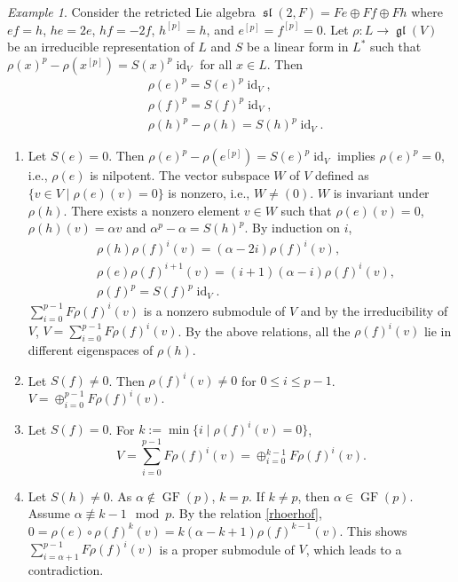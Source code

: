 \documentclass[12pt,MSc]{muthesis_2023}
\theoremstyle{plain}%
\theoremstyle{definition}
\theoremstyle{remark}
\newtheorem{Example}[FactCounter]{Example} %
\DeclareMathOperator{\gl}{\mathfrak{gl}}
\DeclareMathOperator{\Sl}{\mathfrak{sl}}
\DeclareMathOperator{\id}{id}
\DeclareMathOperator{\GF}{GF}
\begin{document}
\begin{Example}\label{sl2isomorphismclasses}
Consider the retricted Lie algebra $\Sl(2,F)=Fe\oplus Ff\oplus Fh$ where $ef=h$, $he=2e$, $hf=-2f$, $h^{[p]}=h$, and $e^{[p]}=f^{[p]}=0$. Let $\rho: L\rightarrow \gl(V)$ be an irreducible representation of $L$ and $S$ be a linear form in $L^*$ such that ${\rho(x)}^p-\rho(x^{[p]})={S(x)}^p\id_V$ for all $x\in L$. Then
\begin{align*}
&{\rho(e)}^p={S(e)}^p\id_V,\\
&{\rho(f)}^p={S(f)}^p\id_V,\\
&{\rho(h)}^p-\rho(h)={S(h)}^p\id_V.
\end{align*}

\begin{enumerate}
\item[(a)] Let $S(e)=0$. Then ${\rho(e)}^p-\rho(e^{[p]})={S(e)}^p\id_V$ implies ${\rho(e)}^p=0$, i.e., $\rho(e)$ is nilpotent. The vector subspace $W$ of $V$ defined as $\{v\in V \mid \rho(e)(v)=0\}$ is nonzero, i.e., $W\neq (0)$. $W$ is invariant under $\rho(h)$. There exists a nonzero element $v\in W$ such that $\rho(e)(v)=0$, $\rho(h)(v)=\alpha v$ and $\alpha^p-\alpha = {S(h)}^p$. By induction on $i$,
\begin{align}
&\rho(h){\rho(f)}^i(v)=(\alpha-2i){\rho(f)}^i(v),\\
\label{rhoerhof}&\rho(e){\rho(f)}^{i+1}(v)= (i+1)(\alpha-i){\rho(f)}^i(v),\\
&{\rho(f)}^p={S(f)}^p\id_V.
\end{align}
$\sum_{i=0}^{p-1}F{\rho(f)}^i(v)$ is a nonzero submodule of $V$ and by the irreducibility of $V$, $V=\sum_{i=0}^{p-1}F{\rho(f)}^i(v)$. By the above relations, all the $\rho(f)^i(v)$ lie in different eigenspaces of $\rho(h)$.

\item[(a.1)] Let $S(f)\neq 0$. Then $\rho(f)^i(v)\neq 0$ for $0 \leq i \leq p-1$. $V= \oplus^{p-1}_{i=0}F{\rho(f)}^i(v).$

\item[(a.2)]
Let $S(f)=0$. For $k:=\min\{i \mid {\rho(f)}^i(v)=0\}$,
$$V=\sum_{i=0}^{p-1}F{\rho(f)}^i(v)= \oplus^{k-1}_{i=0}F{\rho(f)}^i(v).$$


\item[(a.2.1)] Let $S(h)\neq 0$. As $\alpha\notin \GF(p)$, $k=p$. If $k\neq p$, then $\alpha \in \GF(p)$. Assume $\alpha \not\equiv k-1 \mod p$. By the relation \ref{rhoerhof}, $0=\rho(e)\circ {\rho(f)}^k(v)=k(\alpha-k+1){\rho(f)}^{k-1}(v)$. This shows $\sum_{i=\alpha+1}^{p-1}F{\rho(f)}^i(v)$ is a proper submodule of $V$, which leads to a contradiction.


\end{enumerate}
\end{Example}
\end{document}
